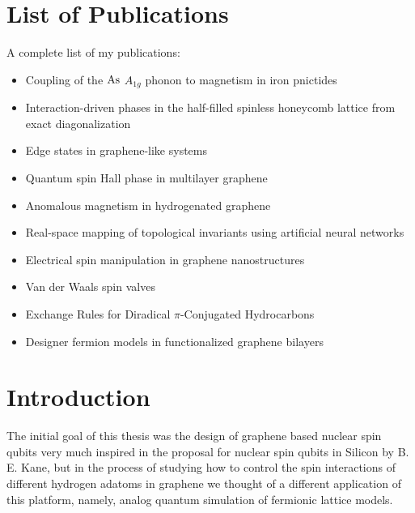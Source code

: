 \chapter{List of Publications}
A complete list of my publications:
\begin{itemize}
   \item Coupling of the $\ce{As}$ $A_{1g}$ phonon to magnetism in iron pnictides\cite{Garcia-Martinez2013}

   \item Interaction-driven phases in the half-filled spinless honeycomb lattice from exact diagonalization\cite{Garcia-Martinez2013a}

   \item Edge states in graphene-like systems\cite{Lado2015}

   \item Quantum spin Hall phase in multilayer graphene\cite{Garcia-Martinez2015}

   \item Anomalous magnetism in hydrogenated graphene\cite{Garcia-Martinez2017}

   \item Real-space mapping of topological invariants using artificial neural networks\cite{Carvalho2018}

   \item Electrical spin manipulation in graphene nanostructures\cite{Ortiz2018}

   \item Van der Waals spin valves\cite{Cardoso2018}

   \item Exchange Rules for Diradical $\pi$-Conjugated Hydrocarbons\cite{Ortiz2019}

   \item Designer fermion models in functionalized graphene bilayers\cite{Garcia-Martinez2019}
\end{itemize}



\chapter{Introduction}
\label{ch:introduction}


The initial goal of this thesis was the design of graphene based nuclear spin qubits very much inspired in the proposal for nuclear spin qubits in Silicon by B. E. Kane\cite{Kane1988}, but in the process of studying how to control the spin interactions of different hydrogen adatoms in graphene we thought of a different application of this platform, namely, analog quantum simulation of fermionic lattice models.

